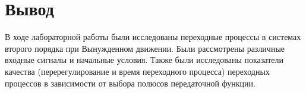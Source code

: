 \chapter{Вывод}
В ходе лабораторной работы были исследованы переходные процессы в системах второго порядка при
Вынужденном движении. Были рассмотрены различные входные сигналы и начальные условия.
Также были исследованы показатели качества (перерегулирование и время переходного процесса) 
переходных процессов в зависимости от выбора полюсов передаточной функции.
\endinput